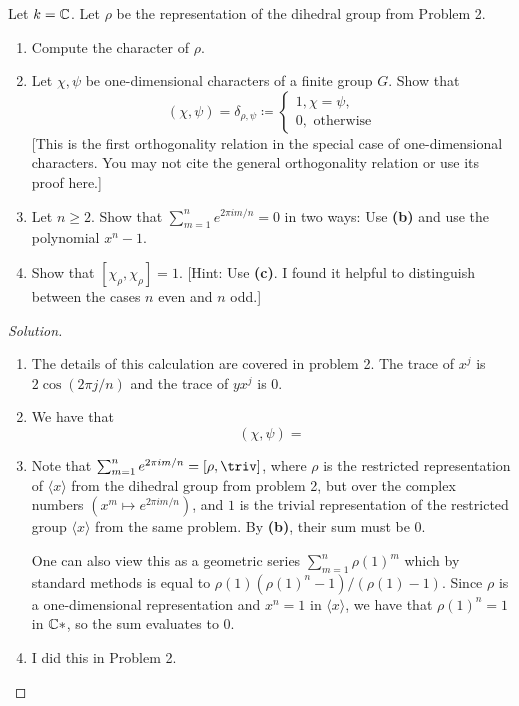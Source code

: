 \begin{problem}
Let $k = \mathbb{C}$. Let $\rho$ be the representation of the dihedral group from Problem 2.

\begin{enumerate}[font=\normalfont,label=\textbf{(\alph*)}]
\item Compute the character of $\rho$.

\item Let $\chi, \psi$ be one-dimensional characters of a finite group $G$. Show that
\[
(\chi, \psi) = \delta_{\rho, \psi} \coloneqq
\begin{cases}
1, \chi = \psi, \\
0, \text{ otherwise}
\end{cases}
\]
[This is the first orthogonality relation in the special case of one-dimensional characters. You may not cite the general orthogonality relation or use its proof here.]
\item Let $n \geq 2$. Show that $\sum_{m=1}^n e^{2\pi im/n} = 0$ in two ways: Use \textbf{(b)} and use the polynomial $x^n-1$.
\item Show that $[\chi_\rho, \chi_\rho] = 1$. [Hint: Use \textbf{(c)}. I found it helpful to distinguish between the cases $n$ even and $n$ odd.]
\end{enumerate}
\end{problem}

\begin{proof}[Solution]
\hfill
\begin{enumerate}[font=\normalfont,label=\textbf{(\alph*)}, wide]
\item The details of this calculation are covered in problem 2. The trace of $x^j$ is $2\cos(2\pi j/n)$ and the trace of $yx^j$ is 0.

\item We have that
\[
(\chi, \psi) =
\]

\item Note that $\sum_{m=1}^ne^{2\pi i m/n} = [\rho, \triv]$, where $\rho$ is the restricted representation of $\langle x \rangle$ from the dihedral group from problem 2, but over the complex numbers $(x^m \mapsto e^{2\pi i m/n})$, and $1$ is the trivial representation of the restricted group $\langle x \rangle$ from the same problem. By \textbf{(b)}, their sum must be 0.

One can also view this as a geometric series $\sum_{m=1}^n\rho(1)^m$ which by standard methods is equal to $\rho(1)(\rho(1)^n - 1)/(\rho(1) -1)$. Since $\rho$ is a one-dimensional representation and $x^n = 1$ in $\langle x \rangle$, we have that $\rho(1)^n = 1$ in $\mathbb{C}*$, so the sum evaluates to 0.

\item I did this in Problem 2.
\end{enumerate}
\end{proof}

